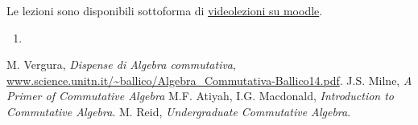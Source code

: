 \documentclass[italian]{article}
\begin{document}
	Le lezioni sono disponibili sottoforma di 
	\href{https://didatticaonline.unitn.it/dol/course/view.php?id=23268}{videolezioni
		su moodle}.
	
	\begin{enumerate}
		\item 
	\end{enumerate}  

    \begin{thebibliography}{9}
       M. Vergura, \textit{Dispense di Algebra commutativa},
        \url{www.science.unitn.it/~ballico/Algebra_Commutativa-Ballico14.pdf}.
       J.S. Milne, \textit{A Primer of Commutative Algebra}
       M.F. Atiyah, I.G. Macdonald, \textit{Introduction to 
            Commutative Algebra}.
       M. Reid, \textit{Undergraduate Commutative Algebra}.
    \end{thebibliography}
\end{document}
